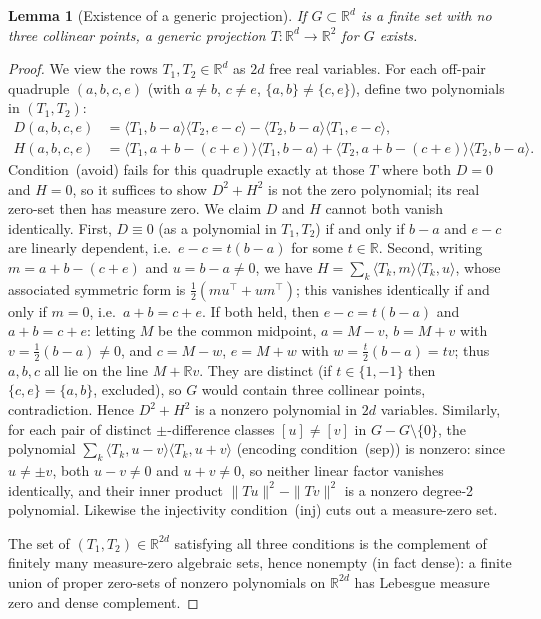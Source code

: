 \documentclass[12pt]{article}
\newtheorem{lemma}[theorem]{Lemma}
\newcommand{\R}{\mathbb{R}}
\newcommand{\ip}[2]{\langle #1,#2\rangle}
\newcommand{\norm}[1]{\|#1\|}
\begin{document}
\begin{lemma}[Existence of a generic projection]
\label{lem:exists-gen}
If $G\subset\R^d$ is a finite set with no three collinear points, a generic
projection $T\colon\R^d\to\R^2$ for $G$ exists.
\end{lemma}

\begin{proof}
We view the rows $T_1,T_2\in\R^d$ as $2d$ free real variables.
For each off-pair quadruple $(a,b,c,e)$ (with $a\ne b$, $c\ne e$, $\{a,b\}\ne\{c,e\}$),
define two polynomials in $(T_1,T_2)$:
\begin{align*}
  D(a,b,c,e) &= \ip{T_1}{b-a}\ip{T_2}{e-c} - \ip{T_2}{b-a}\ip{T_1}{e-c}, \\
  H(a,b,c,e) &= \ip{T_1}{a+b-(c+e)}\ip{T_1}{b-a}
                +\ip{T_2}{a+b-(c+e)}\ip{T_2}{b-a}.
\end{align*}
Condition~(avoid) fails for this quadruple exactly at those $T$ where both
$D=0$ and $H=0$, so it suffices to show $D^2+H^2$ is not the zero polynomial;
its real zero-set then has measure zero.
We claim $D$ and $H$ cannot both vanish identically.
First, $D\equiv 0$ (as a polynomial in $T_1,T_2$) if and only if $b-a$ and
$e-c$ are linearly dependent, i.e.\ $e-c=t(b-a)$ for some $t\in\R$.
Second, writing $m=a+b-(c+e)$ and $u=b-a\ne 0$, we have
$H=\sum_k\ip{T_k}{m}\ip{T_k}{u}$, whose associated symmetric form is
$\tfrac12(mu^\top+um^\top)$; this vanishes identically if and only if $m=0$,
i.e.\ $a+b=c+e$.
If both held, then $e-c=t(b-a)$ and $a+b=c+e$: letting $M$ be the common
midpoint, $a=M-v$, $b=M+v$ with $v=\tfrac12(b-a)\ne 0$, and $c=M-w$, $e=M+w$
with $w=\tfrac{t}{2}(b-a)=tv$; thus $a,b,c$ all lie on the line $M+\R v$.
They are distinct (if $t\in\{1,-1\}$ then $\{c,e\}=\{a,b\}$, excluded), so
$G$ would contain three collinear points, contradiction.
Hence $D^2+H^2$ is a nonzero polynomial in $2d$ variables.
Similarly, for each pair of distinct $\pm$-difference classes $[u]\ne[v]$ in $G{-}G\setminus\{0\}$,
the polynomial $\sum_k\ip{T_k}{u-v}\ip{T_k}{u+v}$ (encoding condition~(sep)) is nonzero:
since $u\ne\pm v$, both $u-v\ne 0$ and $u+v\ne 0$, so neither linear factor vanishes
identically, and their inner product $\norm{Tu}^2-\norm{Tv}^2$ is a nonzero degree-2
polynomial. Likewise the injectivity condition~(inj) cuts out a measure-zero set.

The set of $(T_1,T_2)\in\R^{2d}$ satisfying all three conditions is the complement
of finitely many measure-zero algebraic sets, hence nonempty (in fact dense):
a finite union of proper zero-sets of nonzero polynomials on $\R^{2d}$ has
Lebesgue measure zero and dense complement.
\end{proof}
\end{document}
